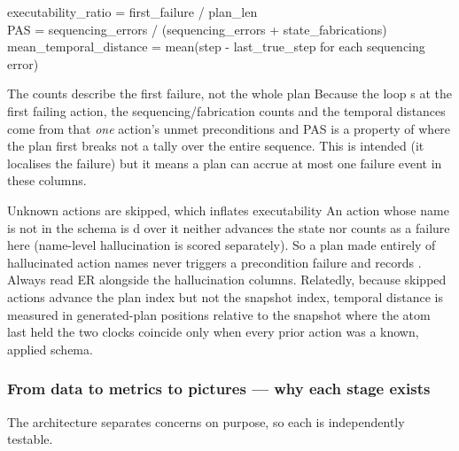 \begin{bmformulabox}
\ttfamily\small
executability_ratio = first_failure / plan_len\\[2pt]
PAS = sequencing_errors / (sequencing_errors + state_fabrications)\\[2pt]
mean_temporal_distance = mean(step - last_true_step  for each sequencing error)
\end{bmformulabox}

\begin{bmcavbox}{The counts describe the first failure, not the whole plan}
Because the loop s at the first failing action, the
sequencing/fabrication counts and the temporal distances come from that
\emph{one} action's unmet preconditions and PAS is a property of where the plan
first breaks not a tally over the entire sequence. This is intended (it
localises the failure) but it means a plan can accrue at most one failure event
in these columns.
\end{bmcavbox}

\begin{bmcavbox}{Unknown actions are skipped, which inflates executability}
An action whose name is not in the schema is d over it neither
advances the state nor counts as a failure here (name-level hallucination is
scored separately). So a plan made entirely of hallucinated action names never
triggers a precondition failure and records .
Always read ER alongside the hallucination columns. Relatedly, because skipped
actions advance the plan index but not the snapshot index, temporal distance is
measured in generated-plan positions relative to the snapshot where the atom
last held the two clocks coincide only when every prior action was a known,
applied schema.
\end{bmcavbox}

\subsubsection{From data to metrics to pictures --- why each stage exists}

The architecture separates concerns on purpose, so each is independently
testable.

